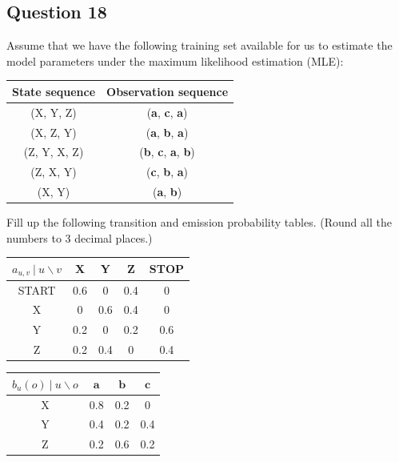 \documentclass[11pt,fancychapters]{article}
\begin{document}
\subsection*{Question 18 {\normalfont{[10 points]}}}

Assume that we have the following training set available for us to estimate the model parameters under the maximum likelihood estimation (MLE):

\begin{table}[h!]
	\centering
	\begin{tabular}{| c | c |}
		\hline
		State sequence & Observation sequence \\
		\hline
		(X, Y, Z) & (\textbf{a}, \textbf{c}, \textbf{a}) \\
		\hline
		(X, Z, Y) & (\textbf{a}, \textbf{b}, \textbf{a}) \\
		\hline
		(Z, Y, X, Z) & (\textbf{b}, \textbf{c}, \textbf{a}, \textbf{b}) \\
		\hline
		(Z, X, Y) & (\textbf{c}, \textbf{b}, \textbf{a}) \\
		\hline
		(X, Y) & (\textbf{a}, \textbf{b}) \\
		\hline
	\end{tabular}
\end{table}

Fill up the following transition and emission probability tables. (Round all the numbers to 3 decimal places.)

\begin{table}[h!]
	\centering
	\begin{tabular}{| c | c | c | c | c |}
		\hline
		$a_{u, v} ~ | ~ u \backslash v$ & X & Y & Z & STOP \\
		\hline
		START & 0.6 & 0 & 0.4 & 0 \\
		\hline
		X & 0 & 0.6 & 0.4 & 0 \\
		\hline
		Y & 0.2 & 0 & 0.2 & 0.6 \\
		\hline
		Z & 0.2 & 0.4 & 0 & 0.4 \\ 
		\hline
	\end{tabular}
\end{table}

\begin{table}[h!]
	\centering
	\begin{tabular}{| c | c | c | c |}
		\hline
		$b_u(o) ~ | ~ u \backslash o$ & $\textbf{a}$ & $\textbf{b}$ & $\textbf{c}$ \\
		\hline
		X & 0.8 & 0.2 & 0 \\
		\hline
		Y & 0.4 & 0.2 & 0.4 \\
		\hline
		Z & 0.2 & 0.6 & 0.2 \\
		\hline
	\end{tabular}
\end{table}
\end{document}
